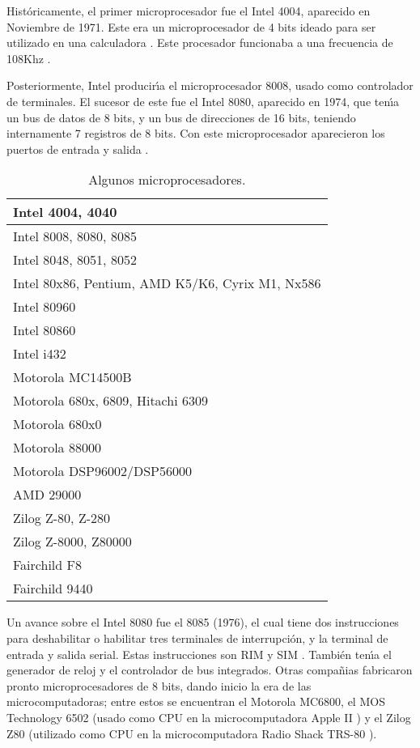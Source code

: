 Hist\'oricamente, el primer microprocesador fue el Intel 4004, aparecido en Noviembre de 1971. %
Este era un microprocesador de 4 bits ideado para ser utilizado en una calculadora \cite{Hall}. %
Este procesador funcionaba a una frecuencia de 108Khz \cite{Micro:Hist}.

Posteriormente, Intel producir\'{\i}a el microprocesador 8008, usado como controlador de %
terminales. El sucesor de este fue el Intel 8080, aparecido en 1974, que ten\'{\i}a un bus de %
datos de 8 bits, y un bus de direcciones de 16 bits, teniendo internamente 7 registros de 8 %
bits. Con este microprocesador aparecieron los puertos de entrada y salida \cite{Micro:Hist}.

\begin{table}[!htb]
\centering
\begin{tabular}{|l|} \hline
{\tiny Intel 4004, 4040} \\ \hline
{\tiny Intel 8008, 8080, 8085} \\ \hline
{\tiny Intel 8048, 8051, 8052} \\ \hline
{\tiny Intel 80x86, Pentium, AMD K5/K6, Cyrix M1, Nx586} \\ \hline
{\tiny Intel 80960} \\ \hline
{\tiny Intel 80860} \\ \hline
{\tiny Intel i432} \\ \hline
{\tiny Motorola MC14500B} \\ \hline
{\tiny Motorola 680x, 6809, Hitachi 6309} \\ \hline
{\tiny Motorola 680x0} \\ \hline
{\tiny Motorola 88000} \\ \hline
{\tiny Motorola DSP96002/DSP56000} \\ \hline
{\tiny AMD 29000} \\ \hline
{\tiny Zilog Z-80, Z-280} \\ \hline
{\tiny Zilog Z-8000, Z80000} \\ \hline
{\tiny Fairchild F8} \\ \hline
{\tiny Fairchild 9440} \\ \hline
\end{tabular} 
\caption{Algunos microprocesadores.} 
\label{Micros1}
\end{table}

Un avance sobre el Intel 8080 fue el 8085 (1976), el cual tiene dos instrucciones para %
deshabilitar o habilitar tres terminales de interrupci\'on, y la terminal de entrada y salida %
serial. Estas instrucciones son RIM y SIM \cite{CEKIT}. Tambi\'en ten\'{\i}a el generador de %
reloj y el controlador de bus integrados. Otras compa\~nias fabricaron pronto microprocesadores %
de 8 bits, dando inicio la era de las microcomputadoras; entre estos se encuentran el Motorola %
MC6800, el MOS Technology 6502 (usado como CPU en la microcomputadora Apple II \cite{Hall}) y %
el Zilog Z80 (utilizado como CPU en la microcomputadora Radio Shack TRS-80 \cite{Hall}).

